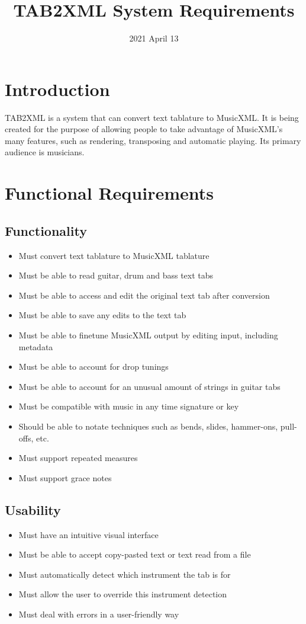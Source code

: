 \documentclass[11pt]{article}
\date{2021 April 13}
\title{TAB2XML System Requirements}
\begin{document}
\maketitle
\tableofcontents

\newpage
\section{Introduction}
\label{sec:org327d7c9}
TAB2XML is a system that can convert text tablature to MusicXML.  It is being created for the purpose of allowing people to take advantage of MusicXML's many features, such as rendering, transposing and automatic playing.  Its primary audience is musicians.
\section{Functional Requirements}
\label{sec:org1aa8243}
\subsection{Functionality}
\label{sec:orgad7a082}
\begin{itemize}
\item Must convert text tablature to MusicXML tablature
\item Must be able to read guitar, drum and bass text tabs
\item Must be able to access and edit the original text tab after conversion
\item Must be able to save any edits to the text tab
\item Must be able to finetune MusicXML output by editing input, including metadata
\item Must be able to account for drop tunings
\item Must be able to account for an unusual amount of strings in guitar tabs
\item Must be compatible with music in any time signature or key
\item Should be able to notate techniques such as bends, slides, hammer-ons, pull-offs, etc.
\item Must support repeated measures
\item Must support grace notes
\end{itemize}
\subsection{Usability}
\label{sec:org90112b6}
\begin{itemize}
\item Must have an intuitive visual interface
\item Must be able to accept copy-pasted text or text read from a file
\item Must automatically detect which instrument the tab is for
\item Must allow the user to override this instrument detection
\item Must deal with errors in a user-friendly way
\end{itemize}
\end{document}
